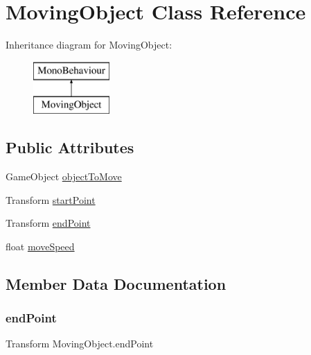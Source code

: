 \hypertarget{class_moving_object}{}\section{Moving\+Object Class Reference}
\label{class_moving_object}
Inheritance diagram for Moving\+Object\+:\begin{figure}[H]
\begin{center}
\leavevmode
\includegraphics[height=2.000000cm]{class_moving_object}
\end{center}
\end{figure}
\subsection*{Public Attributes}
\begin{DoxyCompactItemize}
\item 
Game\+Object \hyperlink{class_moving_object_af4b69a184bdd5b7fdf9f7971fd4f0a33}{object\+To\+Move}
\item 
Transform \hyperlink{class_moving_object_a0e64d125d08a40852bfb66f95ed1ae18}{start\+Point}
\item 
Transform \hyperlink{class_moving_object_a4e00544427448aa5032d17a86ab29ea7}{end\+Point}
\item 
float \hyperlink{class_moving_object_a1b309484a50fd82bf6a370cd7186da36}{move\+Speed}
\end{DoxyCompactItemize}


\subsection{Member Data Documentation}
\mbox{\label{class_moving_object_a4e00544427448aa5032d17a86ab29ea7}} 
\subsubsection{\texorpdfstring{end\+Point}{endPoint}}
{\footnotesize\ttfamily Transform Moving\+Object.\+end\+Point}

\mbox{\label{class_moving_object_a1b309484a50fd82bf6a370cd7186da36}} 
